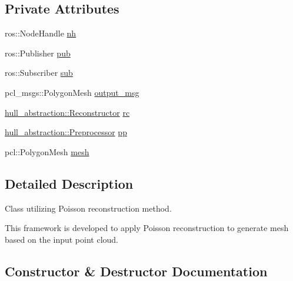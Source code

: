 \subsection*{Private Attributes}
\begin{DoxyCompactItemize}
\item 
ros\+::\+Node\+Handle \hyperlink{classpoisson__reconstruction__node_1_1_poisson_reconstruction_a20283d25ab47d9487311fd84aae03856}{nh}
\item 
ros\+::\+Publisher \hyperlink{classpoisson__reconstruction__node_1_1_poisson_reconstruction_ae771ab3e291d8ae32216a644ef8aa26d}{pub}
\item 
ros\+::\+Subscriber \hyperlink{classpoisson__reconstruction__node_1_1_poisson_reconstruction_a2ea0793db79cbde2bd6195fe3f473392}{sub}
\item 
pcl\+\_\+msgs\+::\+Polygon\+Mesh \hyperlink{classpoisson__reconstruction__node_1_1_poisson_reconstruction_aa96805cee822cdeada23ed2dd3d70ac9}{output\+\_\+msg}
\item 
\hyperlink{classhull__abstraction_1_1_reconstructor}{hull\+\_\+abstraction\+::\+Reconstructor} \hyperlink{classpoisson__reconstruction__node_1_1_poisson_reconstruction_a4630f308fbba0aa64e41f0044d950063}{rc}
\item 
\hyperlink{classhull__abstraction_1_1_preprocessor}{hull\+\_\+abstraction\+::\+Preprocessor} \hyperlink{classpoisson__reconstruction__node_1_1_poisson_reconstruction_a0fd4f45342a06eeb16e43d50a85fb0eb}{pp}
\item 
pcl\+::\+Polygon\+Mesh \hyperlink{classpoisson__reconstruction__node_1_1_poisson_reconstruction_a527bb851ae184ae23ab9a77e40893f1a}{mesh}
\end{DoxyCompactItemize}


\subsection{Detailed Description}
Class utilizing Poisson reconstruction method. 

This framework is developed to apply Poisson reconstruction to generate mesh based on the input point cloud. 

\subsection{Constructor \& Destructor Documentation}
